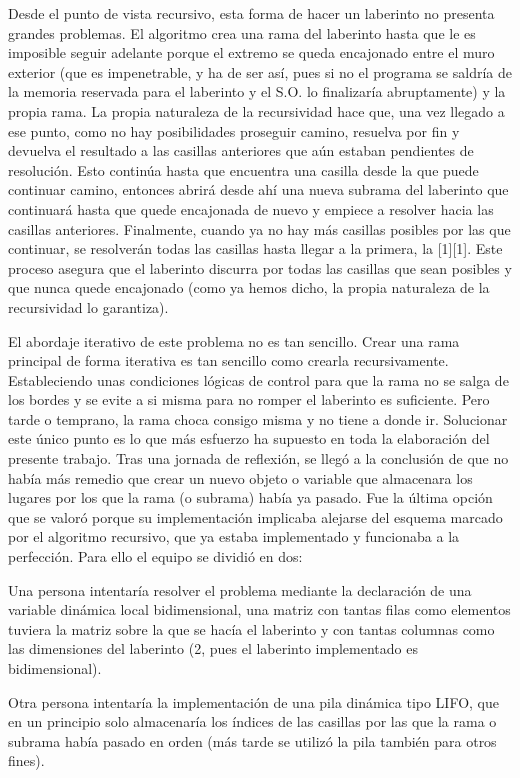 \documentclass[12pt,a4paper]{article}
\begin{document}
Desde el punto de vista recursivo, esta forma de hacer un laberinto no presenta grandes problemas. El algoritmo crea una rama del laberinto hasta que le es imposible seguir adelante porque el extremo se queda encajonado entre el muro exterior (que es impenetrable, y ha de ser así, pues si no el programa se saldría de la memoria reservada para el laberinto y el S.O. lo finalizaría abruptamente) y la propia rama. La propia naturaleza de la recursividad hace que, una vez llegado a ese punto, como no hay posibilidades proseguir camino, resuelva por fin y devuelva el resultado a las casillas anteriores que aún estaban pendientes de resolución. Esto continúa hasta que encuentra una casilla desde la que puede continuar camino, entonces abrirá desde ahí una nueva subrama del laberinto que continuará hasta que quede encajonada de nuevo y empiece a resolver hacia las casillas anteriores. Finalmente, cuando ya no hay más casillas posibles por las que continuar, se resolverán todas las casillas hasta llegar a la primera, la [1][1]. Este proceso asegura que el laberinto discurra por todas las casillas que sean posibles y que nunca quede encajonado (como ya hemos dicho, la propia naturaleza de la recursividad lo garantiza). 

El abordaje iterativo de este problema no es tan sencillo. Crear una rama principal de forma iterativa es tan sencillo como crearla recursivamente. Estableciendo unas condiciones lógicas de control para que la rama no se salga de los bordes y se evite a si misma para no romper el laberinto es suficiente. Pero tarde o temprano, la rama choca consigo misma y no tiene a donde ir. Solucionar este único punto es lo que más esfuerzo ha supuesto en toda la elaboración del presente trabajo. Tras una jornada de reflexión, se llegó a la conclusión de que no había más remedio que crear un nuevo objeto o variable que almacenara los lugares por los que la rama (o subrama) había ya pasado. Fue la última opción que se valoró porque su implementación implicaba alejarse del esquema marcado por el algoritmo recursivo, que ya estaba implementado y funcionaba a la perfección. Para ello el equipo se dividió en dos: 

Una persona intentaría resolver el problema mediante la declaración de una variable dinámica local bidimensional, una matriz con tantas filas como elementos tuviera la matriz sobre la que se hacía el laberinto y con tantas columnas como las dimensiones del laberinto (2, pues el laberinto implementado es bidimensional). 

Otra persona intentaría la implementación de una pila dinámica tipo LIFO, que en un principio solo almacenaría los índices de las casillas por las que la rama o subrama había pasado en orden (más tarde se utilizó la pila también para otros fines). 
\end{document}
